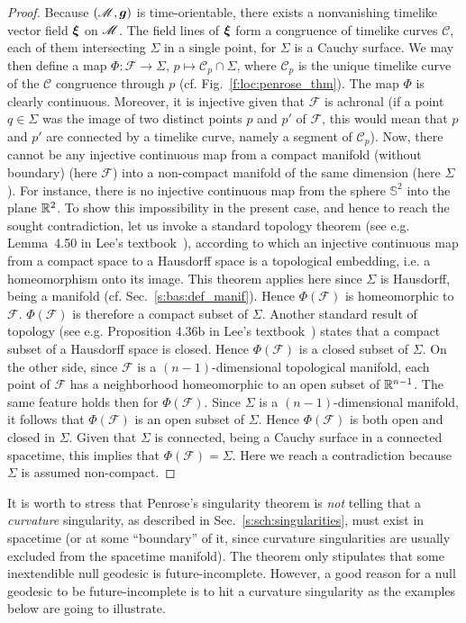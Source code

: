 \begin{proof}
Because $(\mathscr{M},\bm{g})$ is time-orientable, there exists a nonvanishing
timelike vector field $\bm{\xi}$ on $\mathscr{M}$. The field lines of $\bm{\xi}$
form a congruence of timelike curves $\mathscr{C}$, each of them intersecting
$\Sigma$ in a single point, for $\Sigma$ is a Cauchy surface.
We may then define a map $\Phi: \mathscr{F} \to \Sigma$,
$p \mapsto \mathscr{C}_p \cap \Sigma$, where $\mathscr{C}_p$ is the unique
timelike curve of the $\mathscr{C}$ congruence through $p$ (cf. Fig.~\ref{f:loc:penrose_thm}).
The map $\Phi$ is clearly continuous. Moreover, it is injective given that
$\mathscr{F}$ is achronal (if a point $q\in\Sigma$ was the image of two distinct
points $p$ and $p'$ of $\mathscr{F}$, this would mean that $p$ and $p'$
are connected by a timelike curve, namely a segment of $\mathscr{C}_p$).
Now, there cannot be any injective continuous map from a
compact manifold (without boundary) (here $\mathscr{F}$)
into a non-compact manifold of the same dimension (here $\Sigma$). For instance,
there is no injective continuous map from the sphere $\mathbb{S}^2$ into
the plane $\mathbb{R}^2$. To show this impossibility in the present case, and hence
to reach the sought contradiction, let us invoke a
standard topology theorem (see e.g. Lemma~4.50
in Lee's textbook~\cite{Lee11}), according to which an injective continuous map
from a compact space to a Hausdorff space
is a topological embedding, i.e. a homeomorphism onto its image. This theorem applies here
since $\Sigma$ is Hausdorff, being a manifold (cf. Sec.~\ref{s:bas:def_manif}).
Hence $\Phi(\mathscr{F})$ is homeomorphic to $\mathscr{F}$.
$\Phi(\mathscr{F})$ is therefore a compact subset of $\Sigma$.
Another standard result of topology (see e.g. Proposition 4.36b in Lee's textbook~\cite{Lee11})
states that a compact subset of a Hausdorff space is closed. Hence $\Phi(\mathscr{F})$
is a closed subset of $\Sigma$.
On the other side, since $\mathscr{F}$ is a $(n-1)$-dimensional topological manifold,
each point of $\mathscr{F}$
has a neighborhood homeomorphic to an open subset of $\mathbb{R}^{n-1}$. The same feature holds then for
$\Phi(\mathscr{F})$. Since $\Sigma$ is a $(n-1)$-dimensional manifold, it follows that
$\Phi(\mathscr{F})$ is an open subset of $\Sigma$. Hence $\Phi(\mathscr{F})$ is both open
and closed in $\Sigma$. Given that $\Sigma$ is connected, being a Cauchy surface in
a connected spacetime, this implies that
$\Phi(\mathscr{F}) = \Sigma$. Here we reach a contradiction because $\Sigma$
is assumed non-compact.
\end{proof}

It is worth to stress that Penrose's singularity theorem is \emph{not}
telling that a \emph{curvature} singularity, as described in Sec.~\ref{s:sch:singularities},
must exist in spacetime (or at some ``boundary'' of it, since
curvature singularities are usually excluded from the spacetime manifold).
The theorem only stipulates that some inextendible null geodesic is future-incomplete. However,
a good reason for a null geodesic to be future-incomplete is to hit a curvature singularity
as the examples below are going to illustrate.

